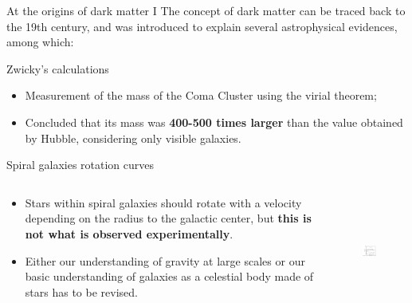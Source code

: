 \documentclass[8pt]{beamer}
\begin{document}
\begin{frame}{At the origins of dark matter I}
\justifying
The concept of dark matter can be traced back to the 19th century, and was introduced to \alert{explain several astrophysical evidences}, among which: \vfill

\vspace{10pt}	
\begin{block}{ \centering Zwicky's calculations}\end{block}

\begin{itemize}
\justifying
\item Measurement of the mass of the Coma Cluster using the virial theorem;
\item Concluded that its mass was \textbf{400-500 times larger} than the value obtained by Hubble, considering only visible galaxies. %
\end{itemize} \vfill

\vspace{10pt}	
\begin{block}{ \centering Spiral galaxies rotation curves}\end{block}

\begin{columns}
	\begin{column}{0.65\textwidth}
\begin{itemize}
\justifying
\vspace{-5pt}	
\item Stars within spiral galaxies should rotate with a velocity depending on the radius to the galactic center, but \textbf{this is not what is observed experimentally}.%
\vspace{1pt}	
\item Either our understanding of gravity at large scales or our basic understanding of galaxies as a celestial body made of stars has to be revised.
\end{itemize} 
\end{column}

\begin{column}{0.44\textwidth}
\begin{figure}[htbp]
\begin{center}
\includegraphics[width=4.5cm, height=3.7cm]{figs/RotationCurve.jpeg}
\end{center}
\end{figure}
\end{column}
\end{columns} \vfill

\end{frame}
\end{document}
